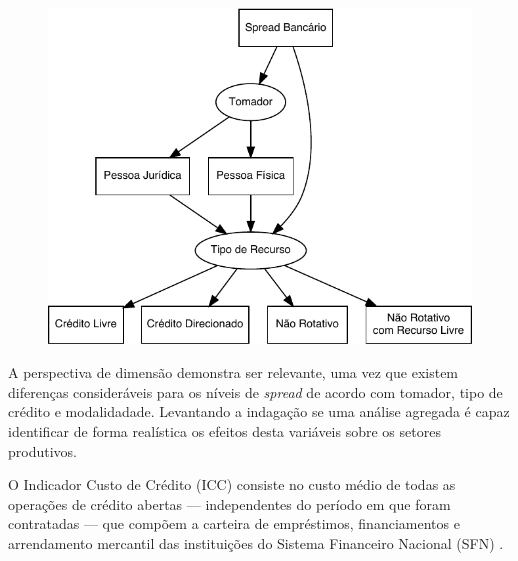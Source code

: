 \documentclass[12pt,12pt,openright,oneside,a4paper,chapter=TITLE,section=TITLE,subsection=TITLE,subsubsection=TITLE,english,french,spanish,portugues,sumario=tradicional]{abntex2}
\begin{document}
\begin{figure}

\begin{center}\includegraphics{12-exportedfigures/diagram.spread.dim-1} \end{center}
\label{fig:diagramc}
\end{figure}

A perspectiva de dimensão demonstra ser relevante, uma vez que existem diferenças consideráveis para os níveis de \emph{spread} de acordo com tomador, tipo de crédito e modalidadade. Levantando a indagação se uma análise agregada é capaz identificar de forma realística os efeitos desta variáveis sobre os setores produtivos.

O Indicador Custo de Crédito (ICC) consiste no custo médio de todas as
operações de crédito abertas --- independentes do período em que foram
contratadas --- que compõem a carteira de empréstimos, financiamentos e
arrendamento mercantil das instituições do Sistema Financeiro Nacional (SFN) \cite{BCB:2000}.
\end{document}
